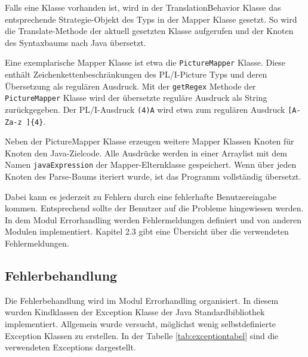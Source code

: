 Falls eine Klasse vorhanden ist, wird in der TranslationBehavior Klasse das entsprechende Strategie-Objekt des Typs  in der
Mapper Klasse gesetzt. So wird die Translate-Methode der aktuell gesetzten Klasse aufgerufen und der Knoten des Syntaxbaums nach Java übersetzt.

Eine exemplarische Mapper Klasse ist etwa die \verb+PictureMapper+ Klasse. Diese enthält Zeichenkettenbeschränkungen des PL/I-Picture Typs und deren Übersetzung als regulären Ausdruck.
Mit der \verb+getRegex+ Methode der \verb+PictureMapper+ Klasse wird der übersetzte reguläre Ausdruck als String zurückgegeben.
Der PL/I-Ausdruck \verb+(4)A+ wird etwa zum regulären Ausdruck \verb+[A-Za-z ]{4}+.   

Neben der PictureMapper Klasse erzeugen weitere Mapper Klassen Knoten für Knoten den Java-Zielcode. 
Alle Ausdrücke werden in einer Arraylist mit dem Namen \verb+javaExpression+ der Mapper-Elternklasse  gespeichert.
Wenn über jeden Knoten des Parse-Baums iteriert wurde, ist das Programm vollständig übersetzt.

Dabei kann es jederzeit zu Fehlern durch eine fehlerhafte Benutzereingabe kommen.
Entsprechend sollte der Benutzer auf die Probleme hingewiesen werden.
In dem Modul Errorhandling werden Fehlermeldungen definiert und von anderen Modulen implementiert. Kapitel 2.3 gibt eine Übersicht über die verwendeten Fehlermeldungen.

\pagebreak

\subsection{Fehlerbehandlung}
Die Fehlerbehandlung wird im Modul Errorhandling organisiert.
In diesem wurden Kindklassen der Exception Klasse der Java Standardbibliothek implementiert.
Allgemein wurde versucht, möglichst wenig selbstdefinierte Exception Klassen zu erstellen.
In der Tabelle \ref{tab:exceptiontabel} sind die verwendeten Exceptions dargestellt.

